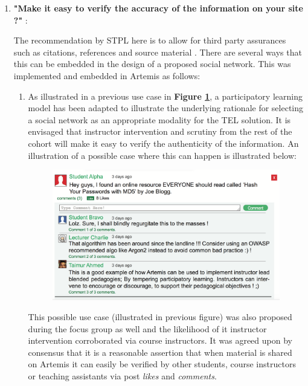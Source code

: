 \begin{enumerate}
    \item \textbf{"Make it easy to verify the accuracy of the information on your site ?"} \cite{Fogg2002a}:
    
    The recommendation by STPL here is to allow for third party assurances such as citations, references and source material \cite{Fogg2002a}. There are several ways that this can be embedded in the design of a proposed social network. This was implemented and embedded in Artemis as follows:
    \begin{enumerate}
        
        \item As illustrated in a previous use case in \textbf{Figure \ref{fig:UseCaseParticipatory}}, a participatory learning model has been adapted to illustrate the underlying rationale for selecting a social network as an appropriate  modality for the TEL solution. It is envisaged that instructor intervention and scrutiny from the rest of the cohort will make it easy to verify the authenticity of the information. An illustration of a possible case where this can happen is illustrated below:
            
        \begin{figure}[H]
        	\centering
        	\includegraphics[scale=0.45,right]{chapters/chapter03/figures/comment.png}
        	\label{fig:UseCaseParticipatory}
        \end{figure}
        
        This possible use case (illustrated in previous figure) was also proposed during the focus group as well and the likelihood of it instructor intervention corroborated via course instructors. It was agreed upon by consensus that it is a reasonable assertion that when material is shared on Artemis it can easily be verified by other students, course instructors or teaching assistants via post \textit{likes} and \textit{comments}.
    

\end{enumerate}
\end{enumerate}

